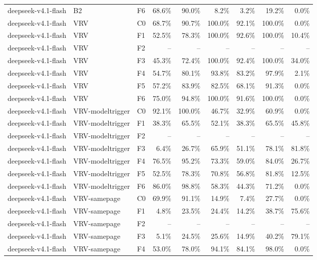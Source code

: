 \begin{tabular}{lllrrrrrr}
deepseek-v4.1-flash & B2 & F6 & 68.6\% & 90.0\% & 8.2\% & 3.2\% & 19.2\% & 0.0\% \\
deepseek-v4.1-flash & VRV & C0 & 68.7\% & 90.7\% & 100.0\% & 92.1\% & 100.0\% & 0.0\% \\
deepseek-v4.1-flash & VRV & F1 & 52.5\% & 78.3\% & 100.0\% & 92.6\% & 100.0\% & 10.4\% \\
deepseek-v4.1-flash & VRV & F2 & -- & -- & -- & -- & -- & -- \\
deepseek-v4.1-flash & VRV & F3 & 45.3\% & 72.4\% & 100.0\% & 92.4\% & 100.0\% & 34.0\% \\
deepseek-v4.1-flash & VRV & F4 & 54.7\% & 80.1\% & 93.8\% & 83.2\% & 97.9\% & 2.1\% \\
deepseek-v4.1-flash & VRV & F5 & 57.2\% & 83.9\% & 82.5\% & 68.1\% & 91.3\% & 0.0\% \\
deepseek-v4.1-flash & VRV & F6 & 75.0\% & 94.8\% & 100.0\% & 91.6\% & 100.0\% & 0.0\% \\
deepseek-v4.1-flash & VRV-modeltrigger & C0 & 92.1\% & 100.0\% & 46.7\% & 32.9\% & 60.9\% & 0.0\% \\
deepseek-v4.1-flash & VRV-modeltrigger & F1 & 38.3\% & 65.5\% & 52.1\% & 38.3\% & 65.5\% & 45.8\% \\
deepseek-v4.1-flash & VRV-modeltrigger & F2 & -- & -- & -- & -- & -- & -- \\
deepseek-v4.1-flash & VRV-modeltrigger & F3 & 6.4\% & 26.7\% & 65.9\% & 51.1\% & 78.1\% & 81.8\% \\
deepseek-v4.1-flash & VRV-modeltrigger & F4 & 76.5\% & 95.2\% & 73.3\% & 59.0\% & 84.0\% & 26.7\% \\
deepseek-v4.1-flash & VRV-modeltrigger & F5 & 52.5\% & 78.3\% & 70.8\% & 56.8\% & 81.8\% & 12.5\% \\
deepseek-v4.1-flash & VRV-modeltrigger & F6 & 86.0\% & 98.8\% & 58.3\% & 44.3\% & 71.2\% & 0.0\% \\
deepseek-v4.1-flash & VRV-samepage & C0 & 69.9\% & 91.1\% & 14.9\% & 7.4\% & 27.7\% & 0.0\% \\
deepseek-v4.1-flash & VRV-samepage & F1 & 4.8\% & 23.5\% & 24.4\% & 14.2\% & 38.7\% & 75.6\% \\
deepseek-v4.1-flash & VRV-samepage & F2 & -- & -- & -- & -- & -- & -- \\
deepseek-v4.1-flash & VRV-samepage & F3 & 5.1\% & 24.5\% & 25.6\% & 14.9\% & 40.2\% & 79.1\% \\
deepseek-v4.1-flash & VRV-samepage & F4 & 53.0\% & 78.0\% & 94.1\% & 84.1\% & 98.0\% & 0.0\% \\

\end{tabular}
